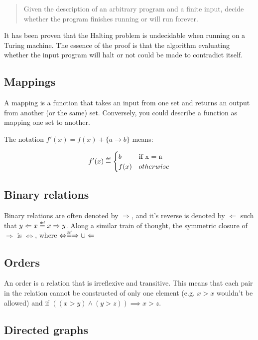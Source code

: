 \begin{quotation}
  Given the description of an arbitrary program and a finite input, decide
  whether the program finishes running or will run forever.
\end{quotation}

It has been proven that the Halting problem is undecidable when running on a
Turing machine. The essence of the proof is that the algorithm evaluating
whether the input program will halt or not could be made to contradict itself.

\subsection{Mappings}

A mapping is a function that takes an input from one set and returns an output
from another (or the same) set. Conversely, you could describe a function as
mapping one set to another.

The notation $ f'(x) = f(x) + \{ a \rightarrow b\}$ means:

\[
  f'(x) \definedas
  \begin{cases}
    b    & \text{if x = a}\\
    f(x) & otherwise
  \end{cases}
\]

\subsection{Binary relations}

Binary relations are often denoted by $\Rightarrow$, and it's reverse is denoted
by $\Leftarrow$ such that $y \Leftarrow x \definedas x \Rightarrow y$. Along a
similar train of thought, the symmetric closure of $\Rightarrow$ is
$\Leftrightarrow$, where $\Leftrightarrow \definedas \Rightarrow \cup
\Leftarrow$

\subsection{Orders}

An order is a relation that is irreflexive and transitive. This means that each
pair in the relation cannot be constructed of only one element (e.g. $x > x$
wouldn't be allowed) and if $((x > y) \wedge (y > z)) \implies x > z$.

\subsection{Directed graphs}

